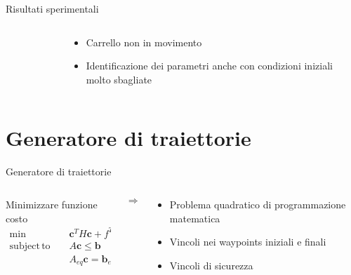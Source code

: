 \documentclass[]{beamer}
\DeclareMathOperator*{\subjectto}{subject\hspace{2pt}to}
\begin{document}
	\begin{frame}{Risultati sperimentali}
		\centering
		\begin{columns}
			\begin{column}{.5\textwidth}
				\centering
				\begin{figure}
					
				\end{figure}
			\end{column}
			\begin{column}{.5\textwidth}
				\centering
				\begin{itemize}
					\item Carrello non in movimento
					\item Identificazione dei parametri anche con condizioni iniziali molto sbagliate
				\end{itemize}
			\end{column}
		\end{columns}
	\end{frame}
	
	
	\section{Generatore di traiettorie}
	
	
	\begin{frame}{Generatore di traiettorie}
		\centering 
		\begin{columns}
			\begin{column}{.4\textwidth}
				\centering
				Minimizzare funzione costo
				\begin{alignat}{2}
					\min\qquad & \mathbf{c}^TH\mathbf{c} + f^T\mathbf{c} \nonumber \\
					\subjectto \qquad & A\mathbf{c} \le \mathbf{b} \nonumber \\
					& A_{eq}\mathbf{c} = \mathbf{b}_{eq} \nonumber
				\end{alignat}
			\end{column}
			\begin{column}{.1\textwidth}
				\centering
				\begin{equation*}
					\Rightarrow
				\end{equation*}
			\end{column}
			\begin{column}{.5\textwidth}
				\centering
				\begin{itemize}
					\item Problema quadratico di programmazione matematica 
					\item Vincoli nei waypoints iniziali e finali
					\item Vincoli di sicurezza
				\end{itemize}
			\end{column}
		\end{columns}
		\begin{figure}
			
		\end{figure}
	\end{frame}
\end{document}
